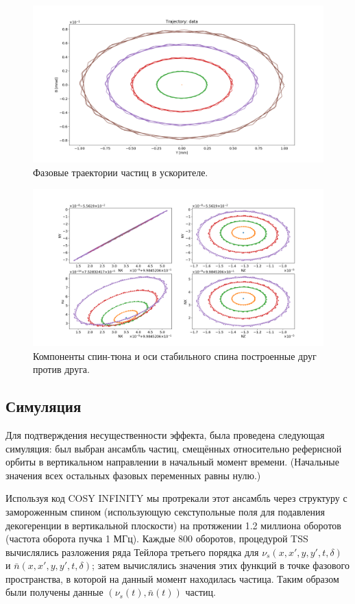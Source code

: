 \begin{figure}[h]
	\centering\hfill
	\includegraphics[width=\textwidth]{images/tss_on_betatron/phase_space}
	\caption{Фазовые траектории частиц в ускорителе.\label{fig:phase_space}}
\end{figure}

\begin{figure}[h]
	\centering
	\includegraphics[width=\textwidth]{images/tss_on_betatron/all_vs_all}
	\caption{Компоненты спин-тюна и оси стабильного спина построенные друг против друга.\label{fig:all_vs_all}}
\end{figure}

\subsection{Симуляция}
Для подтверждения несущественности эффекта, была проведена следующая симуляция: был выбран ансамбль частиц, смещённых относительно рефернсной орбиты в вертикальном направлении в начальный момент времени. (Начальные значения всех остальных фазовых переменных равны нулю.)

Используя код COSY INFINITY мы протрекали этот ансамбль через структуру с замороженным спином (использующую секступольные поля для подавления декогеренции в вертикальной плоскости) на протяжении 1.2 миллиона оборотов (частота оборота пучка 1 МГц). Каждые 800 оборотов, процедурой TSS~\cite{COSYINF:BeamPhysMan} вычислялись разложения ряда Тейлора третьего порядка для $\nu_s(x,x',y,y',t,\delta)$ и $\bar n(x,x',y,y',t,\delta)$; затем вычислялись значения этих функций в точке фазового пространства, в которой на данный момент находилась частица. Таким образом были получены данные $(\nu_s(t), \bar n(t))$ частиц.

